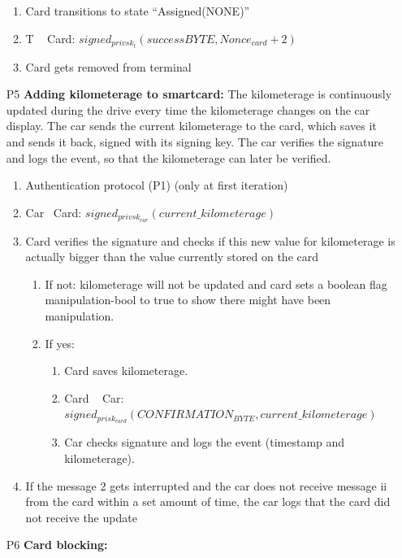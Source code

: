 \documentclass[a4paper]{article}
\begin{document}
\begin{itemize}
\begin{enumerate}
        \item Card transitions to state ``Assigned(NONE)''
        \item T \textrightarrow~ Card: $signed_{privsk_{t}}(successBYTE, Nonce_{card}+2)$
        \item Card gets removed from terminal
    \end{enumerate}
    \item[P5] \textbf{Adding kilometerage to smartcard:} The kilometerage is continuously updated during the drive every time the kilometerage changes on the car display. The car sends the current kilometerage to the card, which saves it and sends it back, signed with its signing key. The car verifies the signature and logs the event, so that the kilometerage can later be verified.
    \begin{enumerate}
        \item Authentication protocol (P1) (only at first iteration)
        \item Car \textrightarrow ~Card: $signed_{privsk_{car}}(current\_kilometerage)$
        \item Card verifies the signature and checks if this new value for kilometerage is actually bigger than the value currently stored on the card
        \begin{enumerate}
            \item If not: kilometerage will not be updated and card sets a boolean flag manipulation-bool to true to show there might have been manipulation.
            \item If yes:
            \begin{enumerate}
                \item Card saves kilometerage.
                \item Card \textrightarrow ~ Car: $signed_{prisk_{card}}(CONFIRMATION_{BYTE}, current\_kilometerage)$
                \item Car checks signature and logs the event (timestamp and kilometerage).
            \end{enumerate}
        \end{enumerate}
        \item If the message 2 gets interrupted and the car does not receive message ii from the card within a set amount of time, the car logs that the card did not receive the update 
    \end{enumerate}
    \item[P6] \textbf{Card blocking:} 
    \begin{enumerate}

\end{enumerate}
\end{itemize}
\end{document}
